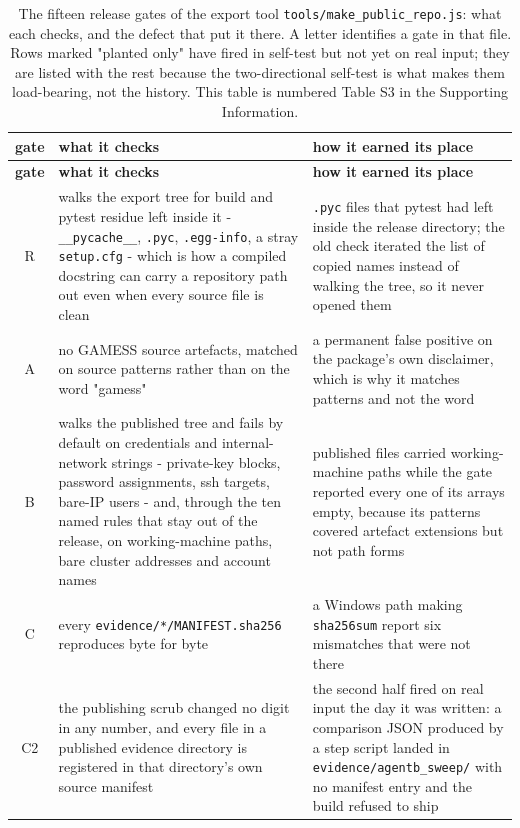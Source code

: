 \documentclass[11pt]{article}
\begin{document}
\footnotesize
\begin{longtable}{c>{\raggedright\arraybackslash}p{}>{\raggedright\arraybackslash}p{}}
\caption{The fifteen release gates of the export tool \texttt{tools/make\_public\_repo.js}: what each checks, and the defect that put it there. A letter identifies a gate in that file. Rows marked "planted only" have fired in self-test but not yet on real input; they are listed with the rest because the two-directional self-test is what makes them load-bearing, not the history. This table is numbered Table S3 in the Supporting Information.}
\label{tab:7}\\
\toprule
\textbf{gate} & \textbf{what it checks} & \textbf{how it earned its place} \\ \midrule
\endfirsthead
\toprule
\textbf{gate} & \textbf{what it checks} & \textbf{how it earned its place} \\ \midrule
\endhead
\bottomrule
\endfoot
R & walks the export tree for build and pytest residue left inside it - \texttt{\_\_pycache\_\_}, \texttt{.pyc}, \texttt{.egg-info}, a stray \texttt{setup.cfg} - which is how a compiled docstring can carry a repository path out even when every source file is clean & 13 \texttt{.pyc} files that pytest had left inside the release directory; the old check iterated the list of copied names instead of walking the tree, so it never opened them \\
A & no GAMESS source artefacts, matched on source patterns rather than on the word "gamess" & a permanent false positive on the package's own disclaimer, which is why it matches patterns and not the word \\
B & walks the published tree and fails by default on credentials and internal-network strings - private-key blocks, password assignments, ssh targets, bare-IP users - and, through the ten named rules that stay out of the release, on working-machine paths, bare cluster addresses and account names & 13 published files carried working-machine paths while the gate reported every one of its arrays empty, because its patterns covered artefact extensions but not path forms \\
C & every \texttt{evidence/*/MANIFEST.sha256} reproduces byte for byte & a Windows path making \texttt{sha256sum} report six mismatches that were not there \\
C2 & the publishing scrub changed no digit in any number, and every file in a published evidence directory is registered in that directory's own source manifest & the second half fired on real input the day it was written: a comparison JSON produced by a step script landed in \texttt{evidence/agentb\_sweep/} with no manifest entry and the build refused to ship \\

\end{longtable}
\end{document}
